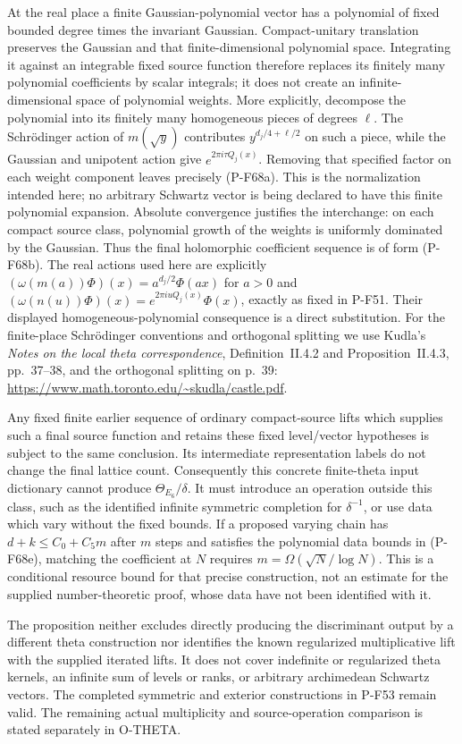 At the real place a finite Gaussian-polynomial vector has a polynomial
of fixed bounded degree times the invariant Gaussian.  Compact-unitary
translation preserves the Gaussian and that finite-dimensional
polynomial space.  Integrating it against an integrable fixed source
function therefore replaces its finitely many polynomial coefficients
by scalar integrals; it does not create an infinite-dimensional space
of polynomial weights.  More explicitly, decompose the polynomial into its finitely many
homogeneous pieces of degrees $\ell$.  The Schr\"odinger action of
$m(\sqrt y)$ contributes $y^{d_j/4+\ell/2}$ on such a piece,
while the Gaussian and unipotent action give
$e^{2\pi i\tau Q_j(x)}$.  Removing that specified factor on each
weight component leaves precisely (P-F68a).  This is the
normalization intended here; no arbitrary Schwartz vector is
being declared to have this finite polynomial expansion.  Absolute convergence
justifies the interchange: on each compact source class, polynomial
growth of the weights is uniformly dominated by the Gaussian.
Thus the final holomorphic coefficient sequence is of form (P-F68b).
The real actions used here are explicitly
$(\omega(m(a))\Phi)(x)=a^{d_j/2}\Phi(ax)$ for $a>0$ and
$(\omega(n(u))\Phi)(x)=e^{2\pi iuQ_j(x)}\Phi(x)$,
exactly as fixed in P-F51.  Their displayed homogeneous-polynomial
consequence is a direct substitution.  For the finite-place
Schr\"odinger conventions and orthogonal splitting we use Kudla's
\emph{Notes on the local theta correspondence},
Definition~II.4.2 and Proposition~II.4.3, pp.~37--38, and the
orthogonal splitting on p.~39:
\url{https://www.math.toronto.edu/~skudla/castle.pdf}.

Any fixed finite earlier sequence of ordinary compact-source lifts
which supplies such a final source function and retains these fixed
level/vector hypotheses is subject to the same conclusion.  Its
intermediate representation labels do not change the final lattice
count.  Consequently this concrete finite-theta input dictionary
cannot produce $\Theta_{E_6}/\delta$.  It must introduce an operation
outside this class, such as the identified infinite symmetric
completion for $\delta^{-1}$, or use data which vary without the
fixed bounds.  If a proposed varying chain has
$d+k\le C_0+C_5m$ after $m$ steps and satisfies the polynomial data
bounds in (P-F68e), matching the coefficient at $N$ requires
$m=\Omega(\sqrt N/\log N)$.  This is a conditional resource bound
for that precise construction, not an estimate for the supplied
number-theoretic proof, whose data have not been identified with it.

The proposition neither excludes directly producing the discriminant
output by a different theta construction nor identifies the known
regularized multiplicative lift with the supplied iterated lifts.
It does not cover indefinite or regularized theta kernels, an infinite
sum of levels or ranks, or arbitrary archimedean Schwartz vectors.
The completed symmetric and exterior constructions in P-F53 remain
valid.  The remaining actual multiplicity and source-operation
comparison is stated separately in O-THETA.
